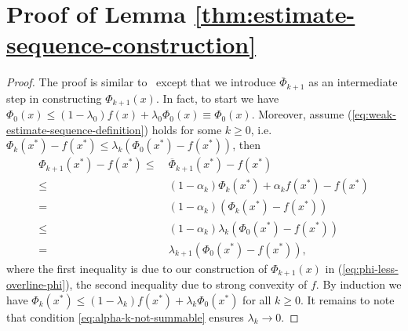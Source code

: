\section{Proof of Lemma \ref{thm:estimate-sequence-construction}} \label{prf:estimate-sequence-construction}
\begin{proof}
	The proof is similar to~\citep[Lemma 2.2.2]{nesterov2004introductory} except that we introduce $\overline{\Phi}_{k+1}$ as an intermediate step in constructing $\Phi_{k+1}(x)$. In fact, to start we have $\Phi_0(x)\le (1-\lambda_0)f(x) + \lambda_0\Phi_0(x)\equiv\Phi_0(x)$. Moreover, assume (\ref{eq:weak-estimate-sequence-definition}) holds for some $k\ge 0$, i.e. $\Phi_k(x^*)-f(x^*)\le \lambda_k(\Phi_0(x^*)-f(x^*))$, then
	\begin{align*}
	\Phi_{k+1}(x^*) - f(x^*) \le &~ \overline{\Phi}_{k+1}(x^*) - f(x^*) \\
	\le &~ (1-\alpha_k)\Phi_k(x^*) + \alpha_k f(x^*) - f(x^*) \\
	= &~ (1-\alpha_k)(\Phi_k(x^*)-f(x^*)) \\
	\le &~ (1-\alpha_k)\lambda_k(\Phi_0(x^*)-f(x^*)) \\
	= &~ \lambda_{k+1}(\Phi_0(x^*)-f(x^*)),
	\end{align*}
	where the first inequality is due to our construction of $\Phi_{k+1}(x)$ in (\ref{eq:phi-less-overline-phi}), the second inequality due to strong convexity of $f$.
	By induction we have $\Phi_k(x^*)\le (1-\lambda_k)f(x^*) + \lambda_k\Phi_0(x^*)$ for all $k\ge 0$. It remains to note that condition \ref{eq:alpha-k-not-summable} ensures $\lambda_k\to 0$.
\end{proof}

